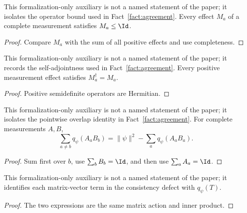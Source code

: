\begin{lemma}
	\label{lem:distance-measurement-effect-le-one}
	\leanok
	This formalization-only auxiliary is not a named statement of the paper; it
	isolates the operator bound used in Fact~\ref{fact:agreement}. Every effect
	$M_a$ of a complete measurement satisfies $M_a\leq\Id$.
\end{lemma}
\begin{proof}
	\leanok
	Compare $M_a$ with the sum of all positive effects and use completeness.
\end{proof}

\begin{lemma}
	\label{lem:distance-measurement-effect-hermitian}
	\leanok
	This formalization-only auxiliary is not a named statement of the paper; it
	records the self-adjointness used in Fact~\ref{fact:agreement}. Every
	positive measurement effect satisfies $M_a^\dagger=M_a$.
\end{lemma}
\begin{proof}
	\leanok
	Positive semidefinite operators are Hermitian.
\end{proof}

\begin{lemma}
	\label{lem:distance-point-defect}
	\leanok
	This formalization-only auxiliary is not a named statement of the paper; it
	isolates the pointwise overlap identity in Fact~\ref{fact:agreement}. For
	complete measurements $A,B$,
	\[
		\sum_{a\ne b}q_\psi(A_aB_b)
		=\|\psi\|^2-\sum_a q_\psi(A_aB_a).
	\]
\end{lemma}
\begin{proof}
	\leanok
	Sum first over $b$, use $\sum_b B_b=\Id$, and then use
	$\sum_a A_a=\Id$.
\end{proof}

\begin{lemma}
	\label{lem:distance-consistency-term}
	\leanok
	This formalization-only auxiliary is not a named statement of the paper; it
	identifies each matrix-vector term in the consistency defect with
	$q_\psi(T)$.
\end{lemma}
\begin{proof}
	\leanok
	The two expressions are the same matrix action and inner product.
\end{proof}

